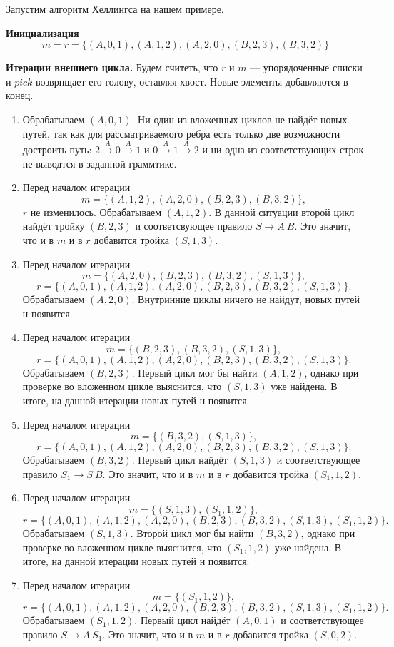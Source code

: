 \begin{example}
  Запустим алгоритм Хеллингса на нашем примере.

  \textbf{Инициализация}
  $$
  m = r = \{(A,0,1),(A,1,2),(A,2,0),(B,2,3),(B,3,2)\}
  $$

  \textbf{Итерации внешнего цикла.} Будем считеть, что $r$ и $m$ --- упорядоченные списки и $pick$ возврпщает его голову, оставляя хвост.
  Новые элементы добавляются в конец.
  \begin{enumerate}
  \item Обрабатываем $(A,0,1)$.
  Ни один из вложенных циклов не найдёт новых путей, так как для рассматриваемого ребра есть только две возможности достроить путь: $2 \xrightarrow{A} 0 \xrightarrow{A} 1$ и $0 \xrightarrow{A} 1 \xrightarrow{A} 2$
  и ни одна из соответствующих строк не выводтся в заданной граммтике.
  \item Перед началом итерации
     $$
     m = \{(A,1,2),(A,2,0),(B,2,3),(B,3,2)\},
     $$ $r$ не изменилось.
     Обрабатываем $(A,1,2)$.
     В данной ситуации второй цикл найдёт тройку $(B,2,3)$ и соответсвующее правило $S \to A \ B$.
     Это значит, что и в $m$ и в $r$ добавится тройка $(S, 1, 3)$.
  \item
   Перед началом итерации
     $$
     m = \{(A,2,0),(B,2,3),(B,3,2),(S,1,3)\},
     $$
     $$
     r= \{(A,0,1),(A,1,2),(A,2,0),(B,2,3),(B,3,2),(S,1,3)\}.
     $$
     Обрабатываем $(A,2,0)$.
     Внутринние циклы ничего не найдут, новых путей н появится.
   \item
   Перед началом итерации
     $$
     m = \{(B,2,3),(B,3,2),(S,1,3)\},
     $$
     $$
     r= \{(A,0,1),(A,1,2),(A,2,0),(B,2,3),(B,3,2),(S,1,3)\}.
     $$
     Обрабатываем $(B,2,3)$.
     Первый цикл мог бы найти $(A,1,2)$, однако при проверке во вложенном цикле выяснится, что $(S, 1, 3)$ уже найдена.
     В итоге, на данной итерации новых путей н появится.
   \item
   Перед началом итерации
     $$
     m = \{(B,3,2),(S,1,3)\},
     $$
     $$
     r= \{(A,0,1),(A,1,2),(A,2,0),(B,2,3),(B,3,2),(S,1,3)\}.
     $$
     Обрабатываем $(B,3,2)$.
     Первый цикл найдёт $(S,1,3)$ и соответствующее правило $S_1 \to S \ B$.
     Это значит, что и в $m$ и в $r$ добавится тройка $(S_1, 1, 2)$.
   \item
   Перед началом итерации
     $$
     m = \{(S,1,3),(S_1, 1, 2)\},
     $$
     $$
     r= \{(A,0,1),(A,1,2),(A,2,0),(B,2,3),(B,3,2),(S,1,3),(S_1, 1, 2)\}.
     $$
     Обрабатываем $(S,1,3)$.
     Второй цикл мог бы найти $(B,3,2)$, однако при проверке во вложенном цикле выяснится, что $(S_1, 1, 2)$ уже найдена.
     В итоге, на данной итерации новых путей н появится.
   \item
   Перед началом итерации
     $$
     m = \{(S_1, 1, 2)\},
     $$
     $$
     r= \{(A,0,1),(A,1,2),(A,2,0),(B,2,3),(B,3,2),(S,1,3),(S_1, 1, 2)\}.
     $$
     Обрабатываем $(S_1,1,2)$.
     Первый цикл найдёт $(A,0,1)$ и соответствующее правило $S \to A \ S_1$.
     Это значит, что и в $m$ и в $r$ добавится тройка $(S, 0, 2)$.


\end{enumerate}
\end{example}
